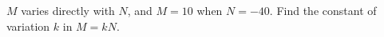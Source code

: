 $M$ varies directly with $N$, and $M=10$ when $N=-40$. Find the constant of variation $k$ in $M=kN$.

